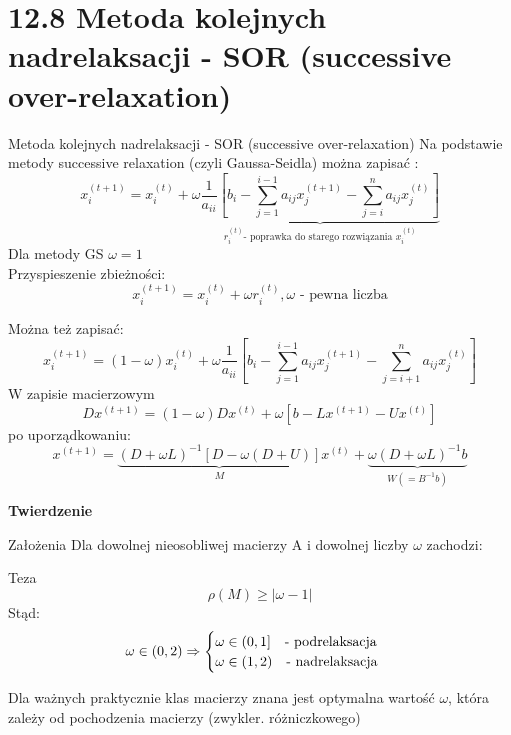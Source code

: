 \section{12.8 Metoda kolejnych nadrelaksacji - SOR (successive over-relaxation)}

\begin{frame}{Metoda kolejnych nadrelaksacji - SOR (successive over-relaxation)}
 Na podstawie metody successive relaxation (czyli Gaussa-Seidla) 
można zapisać :
$$x^{(t+1)}_{i}= x^{(t)}_{i} +\omega \underbrace{\frac{1}{a_{ii}}[b_i-\sum^{i-1}_{j=1} a_{ij} x^{(t+1)}_j -\sum^{n}_{j=i} a_{ij} x^{(t)}_j ]}_{r^{(t)}_i \text{- poprawka do starego rozwiązania } x^{(t)}_i}$$
  Dla metody GS $\omega=1$\\
  Przyspieszenie zbieżności:
  $$\boxed{x^{(t+1)}_{i}=x^{(t)}_{i}+\omega r^{(t)}_{i}}, \text{$\omega$ - pewna liczba}$$
\end{frame}

\begin{frame}
Można też zapisać:
 $$x^{(t+1)}_{i}= (1-\omega)x^{(t)}_{i} +\omega \frac{1}{a_{ii}}[b_i-\sum^{i-1}_{j=1} a_{ij} x^{(t+1)}_j -\sum^{n}_{j=i+1} a_{ij} x^{(t)}_j ] $$
  W zapisie macierzowym
  $$Dx^{(t+1)}=(1-\omega )Dx^{(t)}+\omega [b-Lx^{(t+1)}-Ux^{(t)}]$$
  po uporządkowaniu:
  $$x^{(t+1)}=\underbrace{(D+\omega L)^{-1}[D-\omega (D+U)]}_{M}x^{(t)}+\underbrace{\omega(D+\omega L)^{-1}b}_{W(=B^{-1}b)}$$
\end{frame}

\begin{frame}{}
  \textbf{Twierdzenie}
  \begin{block}{Założenia}
    Dla dowolnej nieosobliwej macierzy A i dowolnej liczby $\omega$ zachodzi:
  \end{block}
  \begin{block}{Teza}
    $$\rho(M)\geq |\omega -1|$$
    Stąd:
    $$
    \omega\in(0,2) \Rightarrow
    \begin{cases}
      \omega\in{(0,1]}\text{\quad- podrelaksacja}\\
      \omega\in{(1,2)}\text{\quad- nadrelaksacja}
    \end{cases}
    $$
  \end{block}
  Dla ważnych praktycznie klas macierzy znana jest optymalna wartość $\omega$, która zależy od pochodzenia macierzy (zwykler. różniczkowego)
\end{frame}

